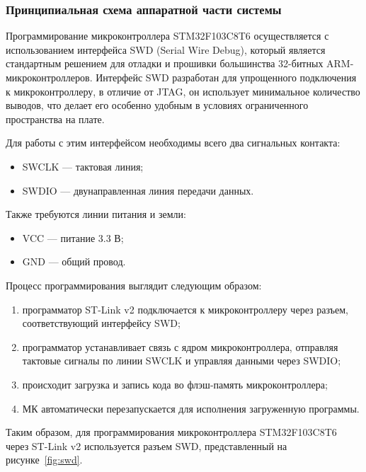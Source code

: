 \subsubsection{Принципиальная схема аппаратной части системы}


Программирование микроконтроллера STM32F103C8T6 осуществляется с использованием интерфейса SWD (Serial Wire Debug), который является стандартным решением для отладки и прошивки большинства 32-битных ARM-микроконтроллеров.
Интерфейс SWD разработан для упрощенного подключения к микроконтроллеру, в отличие от JTAG, он использует минимальное количество выводов, что делает его особенно удобным в условиях ограниченного пространства на плате.

Для работы с этим интерфейсом необходимы всего два сигнальных контакта:
\begin{itemize}
    \item SWCLK — тактовая линия;
    \item SWDIO — двунаправленная линия передачи данных.
\end{itemize}

Также требуются линии питания и земли:
\begin{itemize}
    \item VCC — питание 3.3 В;
    \item GND — общий провод.
\end{itemize}

Процесс программирования выглядит следующим образом:

\begin{enumerate}
    \item программатор ST-Link v2 подключается к микроконтроллеру через разъем, соответствующий интерфейсу SWD;
    \item программатор устанавливает связь с ядром микроконтроллера, отправляя тактовые сигналы по линии SWCLK и управляя данными через SWDIO;
    \item происходит загрузка и запись кода во флэш-память микроконтроллера;
    \item МК автоматически перезапускается для исполнения загруженную программы.
\end{enumerate}

Таким образом, для программирования микроконтроллера STM32F103C8T6 через ST-Link v2 используется разъем SWD, представленный на рисунке~\ref{fig:swd}.

